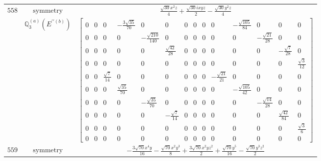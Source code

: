 \documentclass[fleqn,8pt,landscape]{jsarticle}
\begin{document}
\begin{longtable}{ccc}
$ 558 $ & $ \text{symmetry} $ & $ \frac{\sqrt{30} x^{2} z}{4} + \frac{\sqrt{30} i x y z}{2} - \frac{\sqrt{30} y^{2} z}{4} $ \\
$  $ & $ \mathbb{Q}_{3}^{(a)}(E^{\prime\prime(b)}) $ & $ \begin{bmatrix} 0 & 0 & 0 & - \frac{3 \sqrt{35}}{70} & 0 & 0 & 0 & 0 & 0 & 0 & - \frac{\sqrt{105}}{84} & 0 & 0 & 0 \\ 0 & 0 & 0 & 0 & - \frac{\sqrt{210}}{140} & 0 & 0 & 0 & 0 & 0 & 0 & - \frac{\sqrt{21}}{28} & 0 & 0 \\ 0 & 0 & 0 & 0 & 0 & \frac{\sqrt{42}}{28} & 0 & 0 & 0 & 0 & 0 & 0 & - \frac{\sqrt{7}}{28} & 0 \\ 0 & 0 & 0 & 0 & 0 & 0 & 0 & 0 & 0 & 0 & 0 & 0 & 0 & \frac{\sqrt{3}}{12} \\ 0 & 0 & \frac{\sqrt{7}}{14} & 0 & 0 & 0 & 0 & 0 & 0 & - \frac{\sqrt{21}}{21} & 0 & 0 & 0 & 0 \\ 0 & 0 & 0 & \frac{\sqrt{35}}{70} & 0 & 0 & 0 & 0 & 0 & 0 & - \frac{\sqrt{105}}{42} & 0 & 0 & 0 \\ 0 & 0 & 0 & 0 & - \frac{\sqrt{35}}{70} & 0 & 0 & 0 & 0 & 0 & 0 & - \frac{\sqrt{14}}{28} & 0 & 0 \\ 0 & 0 & 0 & 0 & 0 & - \frac{\sqrt{7}}{14} & 0 & 0 & 0 & 0 & 0 & 0 & \frac{\sqrt{42}}{84} & 0 \\ 0 & 0 & 0 & 0 & 0 & 0 & 0 & 0 & 0 & 0 & 0 & 0 & 0 & \frac{\sqrt{3}}{6} \\ 0 & 0 & 0 & 0 & 0 & 0 & 0 & 0 & 0 & 0 & 0 & 0 & 0 & 0 \end{bmatrix} $ \\ \hline
$ 559 $ & $ \text{symmetry} $ & $ - \frac{3 \sqrt{70} x^{4} y}{16} - \frac{\sqrt{70} x^{2} y^{3}}{8} + \frac{3 \sqrt{70} x^{2} y z^{2}}{2} + \frac{\sqrt{70} y^{5}}{16} - \frac{\sqrt{70} y^{3} z^{2}}{2} $ \\

\end{longtable}
\end{document}
